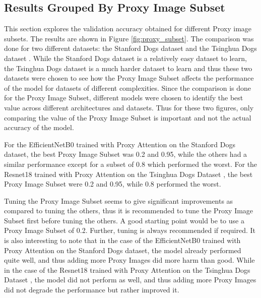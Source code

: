 \subsection{Results Grouped By Proxy Image Subset}
This section explores the validation accuracy obtained for different Proxy image subsets. The results are shown in Figure \ref{fig:proxy_subset}.
The comparison was done for two different datasets: the Stanford Dogs dataset \cite{khoslaNovelDatasetFineGrained} and the Tsinghua Dogs dataset \cite{zouNewDatasetDog2020}. While the Stanford Dogs dataset is a relatively easy dataset to learn, the Tsinghua Dogs dataset is a much harder dataset to learn and thus these two datasets were chosen to see how the Proxy Image Subset affects the performance of the model for datasets of different complexities. Since the comparison is done for the Proxy Image Subset, different models were chosen to identify the best value across different architectures and datasets. Thus for these two figures, only comparing the value of the Proxy Image Subset is important and not the actual accuracy of the model.

For the EfficientNetB0 \cite{tanEfficientnetRethinkingModel2019} trained with Proxy Attention on the Stanford Dogs dataset\cite{khoslaNovelDatasetFineGrained}, the best Proxy Image Subset was 0.2 and 0.95, while the others had a similar performance except for a subset of 0.8 which performed the worst. For the Resnet18 \cite{heDeepResidualLearning2016} trained with Proxy Attention on the Tsinghua Dogs Dataset \cite{zouNewDatasetDog2020}, the best Proxy Image Subset were 0.2 and 0.95, while 0.8 performed the worst.

Tuning the Proxy Image Subset seems to give significant improvements as compared to tuning the others, thus it is recommended to tune the Proxy Image Subset first before tuning the others. A good starting point would be to use a Proxy Image Subset of 0.2. Further, tuning is always recommended if required.
It is also interesting to note that in the case of the EfficientNetB0 \cite{tanEfficientnetRethinkingModel2019} trained with Proxy Attention on the Stanford Dogs dataset\cite{khoslaNovelDatasetFineGrained}, the model already performed quite well, and thus adding more Proxy Images did more harm than good. While in the case of the Resnet18 \cite{heDeepResidualLearning2016} trained with Proxy Attention on the Tsinghua Dogs Dataset \cite{zouNewDatasetDog2020}, the model did not perform as well, and thus adding more Proxy Images did not degrade the performance but rather improved it.

